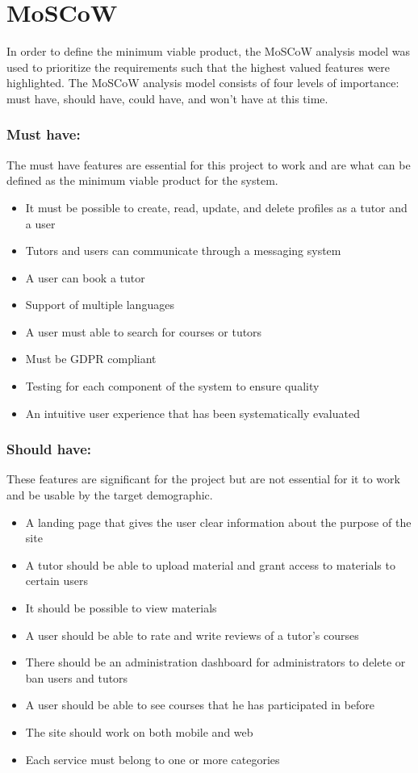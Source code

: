 \section{MoSCoW}
In order to define the minimum viable product, the MoSCoW analysis model was used to prioritize the requirements such that the highest valued features were highlighted.
The MoSCoW analysis model consists of four levels of importance: must have, should have, could have, and won't have at this time.

\subsubsection{Must have:}
The must have features are essential for this project to work and are what can be defined as the minimum viable product for the system.

\begin{itemize}
    \item It must be possible to create, read, update, and delete profiles as a tutor and a user
    \item Tutors and users can communicate through a messaging system
    \item A user can book a tutor
    \item Support of multiple languages
    \item A user must able to search for courses or tutors
    \item Must be GDPR compliant
    \item Testing for each component of the system to ensure quality
    \item An intuitive user experience that has been systematically evaluated
\end{itemize}

\subsubsection{Should have:}
These features are significant for the project but are not essential for it to work and be usable by the target demographic.

\begin{itemize}
    \item A landing page that gives the user clear information about the purpose of the site
    \item A tutor should be able to upload material and grant access to materials to certain users
    \item It should be possible to view materials
    \item A user should be able to rate and write reviews of a tutor's courses
    \item There should be an administration dashboard for administrators to delete or ban users and tutors
    \item A user should be able to see courses that he has participated in before
    \item The site should work on both mobile and web
    \item Each service must belong to one or more categories
\end{itemize}

